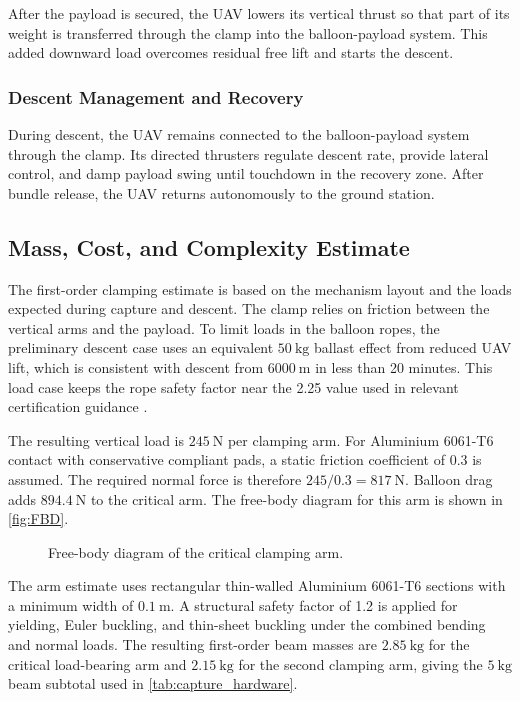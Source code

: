 After the payload is secured, the UAV lowers its vertical thrust so that
part of its weight is transferred through the clamp into the
balloon-payload system. This added downward load overcomes residual free
lift and starts the descent.

\subsubsection{Descent Management and Recovery}

During descent, the UAV remains connected to the balloon-payload system
through the clamp. Its directed thrusters regulate descent rate, provide
lateral control, and damp payload swing until touchdown in the recovery
zone. After bundle release, the UAV returns autonomously to the ground
station.


\subsection{Mass, Cost, and Complexity Estimate}

The first-order clamping estimate is based on the mechanism layout and
the loads expected during capture and descent. The clamp relies on
friction between the vertical arms and the payload. To limit loads in
the balloon ropes, the preliminary descent case uses an equivalent
\(50~\mathrm{kg}\) ballast effect from reduced UAV lift, which is
consistent with descent from \(6000~\mathrm{m}\) in less than
20 minutes. This load case keeps the rope safety factor near the
2.25 value used in relevant certification guidance
\cite{EASA2009EuropeanCS-31HB}.

The resulting vertical load is \(245~\mathrm{N}\) per clamping arm. For
Aluminium 6061-T6 contact with conservative compliant pads, a static
friction coefficient of \(0.3\) is assumed. The required normal force is
therefore \(245/0.3=817~\mathrm{N}\). Balloon drag adds
\(894.4~\mathrm{N}\) to the critical arm. The free-body diagram for this
arm is shown in \autoref{fig:FBD}.

\begin{figure}[h!]
    \centering
        \resizebox{0.6\textwidth}{!}{%
        
    }
    \caption{Free-body diagram of the critical clamping arm.}
    \label{fig:FBD}
\end{figure}
The arm estimate uses rectangular thin-walled Aluminium 6061-T6 sections
with a minimum width of \(0.1~\mathrm{m}\). A structural safety factor of
1.2 is applied for yielding, Euler buckling, and thin-sheet buckling
under the combined bending and normal loads. The resulting first-order
beam masses are \(2.85~\mathrm{kg}\) for the critical load-bearing arm
and \(2.15~\mathrm{kg}\) for the second clamping arm, giving the
\(5~\mathrm{kg}\) beam subtotal used in \autoref{tab:capture_hardware}.









